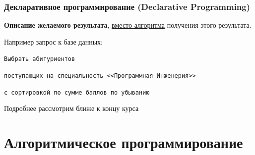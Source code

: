 {    

    \begin{frame}
      \frametitle{Декларативное программирование (Declarative Programming)}
      \textbf{Описание желаемого результата}, \underline{вместо алгоритма} получения этого результата.\linebreak
        \vspace{0.5cm}

        Например запрос к базе данных:

        \vspace{0.5cm}
        \texttt{Выбрать абитуриентов}

        \texttt{поступающих на специальность <<Программная Инженерия>>}

        \texttt{с сортировкой по сумме баллов по убыванию}
        \vspace{1cm}

        Подробнее рассмотрим ближе к концу курса
    \end{frame}


  \section{Алгоритмическое программирование}

}

